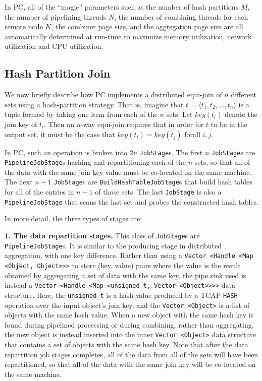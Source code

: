  
In PC, all of the ``magic'' parameters such as the number of hash partitions $M$, 
the number of pipelining threads $N$, 
the number of combining threads for each remote node $K$, 
the combiner page size, and the aggregation page size are all automatically 
determined at run-time to maximize memory utilization, network utilization and CPU utilization. 

\subsection{Hash Partition Join}

We now briefly describe how PC implements a distributed equi-join of $n$ different sets using a hash-partition strategy.  
That is, imagine that $t$ = $\langle t_1, t_2, ..., t_n \rangle$ is a
tuple formed by taking one item from each of the $n$ sets.  Let $key(t_i)$ denote the join key of $t_i$.  Then an $n$-way equi-join requires that
in order for $t$ to be in the output set, it must be the case that
$key(t_i) = key(t_j)$ forall $i, j$. 

In PC, such an operation is broken into $2n$ \texttt{JobStage}s. The first $n$
\texttt{JobStage}s are \texttt{PipelineJobStage}s hashing and repartitioning each of the $n$ sets, so that all of the data with the same join key value
must be co-located on the same machine.  The next $n - 1$ \texttt{JobStage}s
are \texttt{BuildHashTableJobStage}s that build hash tables for all of the
entries in $n - 1$ of those sets.  The last \texttt{JobStage} is also a 
\texttt{PipelineJobStage} that scans the last set and
probes the constructed hash tables.  

In more detail, the three types of stages are:

\vspace{5pt}
{\bf 1. The data repartition stages.} This class of \texttt{JobStage}s are
\texttt{PipelineJobStage}s. It is similar to the producing stage in distributed
aggregation, with one key difference.
Rather than using a \texttt{Vector <Handle <Map <Object, Object}\texttt{>}\texttt{>}\texttt{>} to store (key, value) pairs where the value is the result obtained by aggregating a set of
data with the same key, the pipe sink used is instead a \texttt{Vector <Handle <Map <unsigned\_t, Vector <Object}\texttt{>}\texttt{>}\texttt{>}\texttt{>} data structure.  Here, the
\texttt{unsigned\_t} is a hash value produced by a TCAP \texttt{HASH} operation over the input object's join key, and the \texttt{Vector <Object>} is a list of objects
with the same hash value.  
When a new object with the same hash key is found during pipelined processing or during combining, rather than aggregating, the new object is instead inserted
into the inner \texttt{Vector <Object>} data structure that contains a set of objects with the same hash key.
Note that after the data repartition job stages completes, all of the data from all of the sets will have been repartitioned, so that all of the data with the same join
key will be co-located on the same machine.

